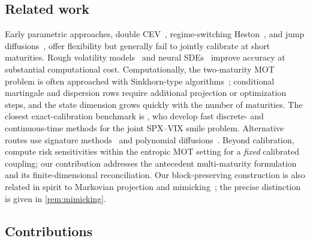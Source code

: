 \documentclass{article}
\begin{document}
\subsection{Related work}\label{subsec:related}

Early parametric approaches, double CEV~\citep{gatheral2008consistent}, regime-switching Heston~\citep{papanicolaou2014regime}, and jump diffusions~\citep{cont2013consistent,baldeaux2014consistent}, offer flexibility but generally fail to jointly calibrate at short maturities.
Rough volatility models~\citep{gatheral2018volatility,jacquier2025rough,gatheral2020quadratic} and neural SDEs~\citep{guyon2023neural} improve accuracy at substantial computational cost.
Computationally, the two-maturity MOT problem is often approached with Sinkhorn-type algorithms~\citep{cuturi2013sinkhorn,altschuler2017near,Benamou2015Iterative,lin2022complexity}; conditional martingale and dispersion rows require additional projection or optimization steps, and the state dimension grows quickly with the number of maturities.
The closest exact-calibration benchmark is \citet{bourgey2024fast}, who develop fast discrete- and continuous-time methods for the joint SPX--VIX smile problem.
Alternative routes use signature methods~\citep{cuchiero2025joint} and polynomial diffusions~\citep{abi2025joint}.
Beyond calibration, \citet{che2026spx} compute risk sensitivities within the entropic MOT setting for a \emph{fixed} calibrated coupling; our contribution addresses the antecedent multi-maturity formulation and its finite-dimensional reconciliation.
Our block-preserving construction is also related in spirit to Markovian projection and mimicking~\citep{gyongy1986mimicking,brunick2013mimicking}; the precise distinction is given in \cref{rem:mimicking}.

\subsection{Contributions}\label{subsec:contributions}
\end{document}
